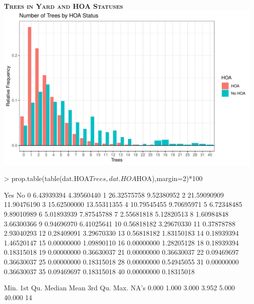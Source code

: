 \documentclass{article}
\begin{document}
\newpage
\textsc{\textbf{Trees in Yard and HOA Statuses}}
\newline
\newline
\includegraphics{exam22-017}

\begin{Schunk}
\begin{Sinput}
> prop.table(table(dat.HOA$Trees, dat.HOA$HOA),margin=2)*100
\end{Sinput}
\begin{Soutput}
             Yes          No
  0   6.43939394  4.39560440
  1  26.32575758  9.52380952
  2  21.59090909 11.90476190
  3  15.62500000 13.55311355
  4  10.79545455  9.70695971
  5   6.72348485  9.89010989
  6   5.01893939  7.87545788
  7   2.55681818  5.12820513
  8   1.60984848  3.66300366
  9   0.94696970  6.41025641
  10  0.56818182  3.29670330
  11  0.37878788  2.93040293
  12  0.28409091  3.29670330
  13  0.56818182  1.83150183
  14  0.18939394  1.46520147
  15  0.00000000  1.09890110
  16  0.00000000  1.28205128
  18  0.18939394  0.18315018
  19  0.00000000  0.36630037
  21  0.00000000  0.36630037
  22  0.09469697  0.36630037
  25  0.00000000  0.18315018
  28  0.00000000  0.54945055
  31  0.00000000  0.36630037
  35  0.09469697  0.18315018
  40  0.00000000  0.18315018
\end{Soutput}
\begin{Soutput}
   Min. 1st Qu.  Median    Mean 3rd Qu.    Max.    NA's 
  0.000   1.000   3.000   3.952   5.000  40.000      14 
\end{Soutput}
\end{Schunk}
\end{document}
